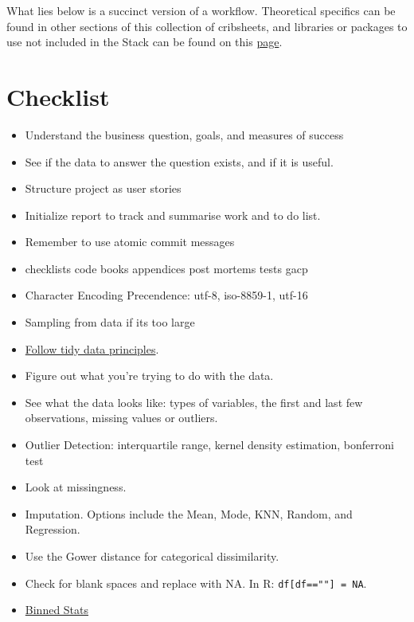 \documentclass[]{book}
\begin{document}
What lies below is a succinct version of a workflow. Theoretical specifics can be found in other sections of this collection of cribsheets, and libraries or packages to use not included in the Stack can be found on this \href{https://gfleetwood.github.io/noted-resources/data_science.html}{page}.

\hypertarget{checklist}{%
\section{Checklist}\label{checklist}}

\begin{itemize}
\item
  Understand the business question, goals, and measures of success
\item
  See if the data to answer the question exists, and if it is useful.
\item
  Structure project as user stories
\item
  Initialize report to track and summarise work and to do list.
\item
  Remember to use atomic commit messages
\item
  checklists \textbar{} code books \textbar{} appendices \textbar{} post mortems \textbar{} tests \textbar{} gacp
\item
  Character Encoding Precendence: utf-8, iso-8859-1, utf-16
\item
  Sampling from data if its too large
\item
  \href{http://vita.had.co.nz/papers/tidy-data.pdf}{Follow tidy data principles}.
\item
  Figure out what you're trying to do with the data.
\item
  See what the data looks like: types of variables, the first and last few observations, missing values or outliers.
\item
  Outlier Detection: interquartile range, kernel density estimation, bonferroni test
\item
  Look at missingness.
\item
  Imputation. Options include the Mean, Mode, KNN, Random, and Regression.
\item
  Use the Gower distance for categorical dissimilarity.
\item
  Check for blank spaces and replace with NA. In R: \texttt{df{[}df==""{]}\ =\ NA}.
\item
  \href{https://docs.scipy.org/doc/scipy-0.16.0/reference/generated/scipy.stats.binned_statistic.html}{Binned Stats}

\end{itemize}
\end{document}

